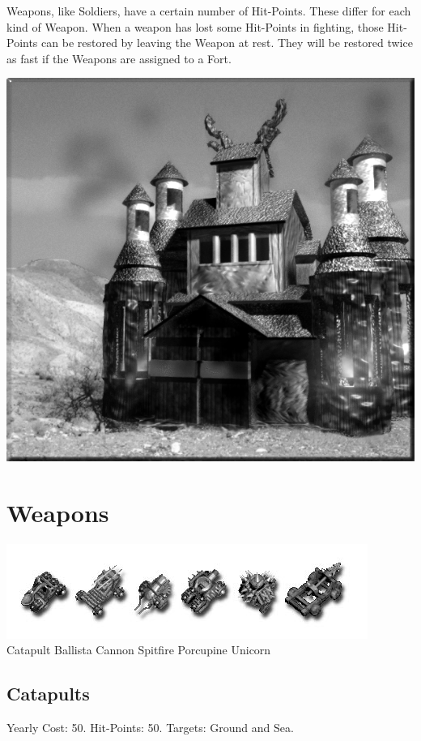 Weapons, like Soldiers, have a certain number of Hit-Points. These differ for each kind of Weapon. When a weapon has lost some Hit-Points in fighting, those Hit-Points can be restored by leaving the Weapon at rest. They will be restored twice as fast if the Weapons are assigned to a Fort.

\begin{center}
	\includegraphics[width=0.7\linewidth]{Awarfactory}
\end{center}

\section{Weapons}

\begin{center}
	\includegraphics[width=0.7\linewidth]{Iweapons}
	\\ Catapult Ballista Cannon Spitfire Porcupine Unicorn
\end{center}

\clearpage

\subsection{Catapults}


\begin{center}
	Yearly Cost: 50. Hit-Points: 50. Targets: Ground and Sea.
\end{center}

